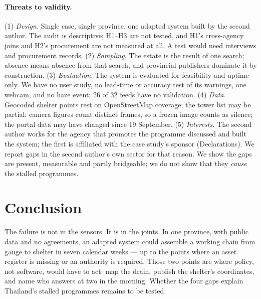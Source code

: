 \documentclass[10pt,twocolumn,a4paper]{article}
\begin{document}
\paragraph{Threats to validity.}\label{sec:limits} (1) \emph{Design.} Single case, single province, one adapted system built by the second author. The audit is descriptive; H1--H3 are not tested, and H1\textquoteright s cross-agency joins and H2\textquoteright s procurement are not measured at all. A test would need interviews and procurement records. (2) \emph{Sampling.} The estate is the result of one search; absence means absence from that search, and provincial publishers dominate it by construction. (3) \emph{Evaluation.} The system is evaluated for feasibility and uptime only. We have no user study, no lead-time or accuracy test of its warnings, one webcam, and no haze event; 26 of 32 feeds have no validation. (4) \emph{Data.} Geocoded shelter points rest on OpenStreetMap coverage; the tower list may be partial; camera figures count distinct frames, so a frozen image counts as silence; the portal data may have changed since 19 September. (5) \emph{Interests.} The second author works for the agency that promotes the programme discussed and built the system; the first is affiliated with the case study\textquoteright s sponsor (Declarations). We report gaps in the second author\textquoteright s own sector for that reason. We show the gaps are present, measurable and partly bridgeable; we do not show that they \emph{cause} the stalled programmes.

\section{Conclusion}
The failure is not in the sensors. It is in the joints. In one province, with public data and no agreements, an adapted system could assemble a working chain from gauge to shelter in seven calendar weeks --- up to the points where an asset register is missing or an authority is required. Those two points are where policy, not software, would have to act: map the drain, publish the shelter\textquoteright s coordinates, and name who answers at two in the morning. Whether the four gaps explain Thailand\textquoteright s stalled programmes remains to be tested.
\end{document}
